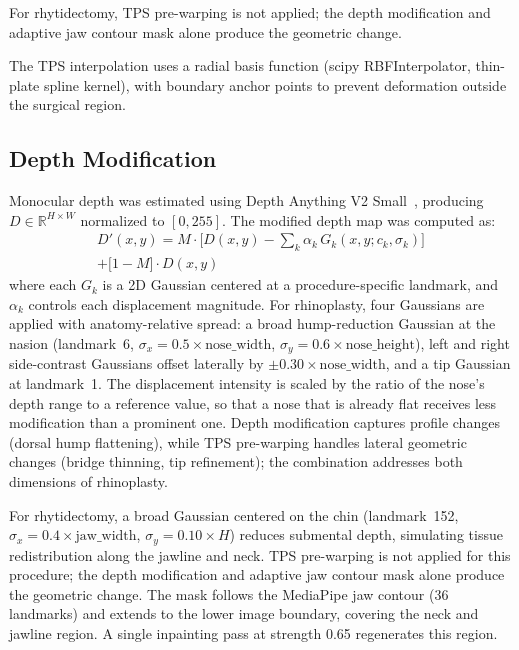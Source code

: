 \documentclass[twocolumn]{article}
\begin{document}
For rhytidectomy, TPS pre-warping is not applied; the depth
modification and adaptive jaw contour mask alone produce the
geometric change.

The TPS interpolation uses a radial basis function
(scipy RBFInterpolator, thin-plate spline kernel),
with boundary anchor points to prevent deformation outside the
surgical region.

\subsection{Depth Modification}

Monocular depth was estimated using Depth Anything V2
Small~\cite{yang2024depth}, producing $D \in \mathbb{R}^{H \times W}$
normalized to $[0, 255]$. The modified depth map was computed as:
\begin{multline}
D'(x,y) = M \!\cdot\! \bigl[D(x,y) - \textstyle\sum_k \alpha_k \,
G_k(x,y; c_k, \sigma_k)\bigr] \\
+ \bigl[1 - M\bigr] \cdot D(x,y)
\label{eq:depth_mod}
\end{multline}
where each $G_k$ is a 2D Gaussian centered at a procedure-specific
landmark, and $\alpha_k$ controls each displacement magnitude.
For rhinoplasty, four Gaussians are applied with anatomy-relative
spread: a broad hump-reduction Gaussian at the nasion (landmark~6,
$\sigma_x = 0.5 \times \text{nose\_width}$,
$\sigma_y = 0.6 \times \text{nose\_height}$), left and right
side-contrast Gaussians offset laterally by
$\pm 0.30 \times \text{nose\_width}$, and a tip Gaussian at
landmark~1. The displacement intensity is scaled by the ratio of the
nose's depth range to a reference value, so that a nose that is
already flat receives less modification than a prominent one. Depth modification captures profile changes (dorsal
hump flattening), while TPS pre-warping handles lateral geometric
changes (bridge thinning, tip refinement); the combination addresses
both dimensions of rhinoplasty.

For rhytidectomy, a broad Gaussian centered on the chin
(landmark~152, $\sigma_x = 0.4 \times \text{jaw\_width}$,
$\sigma_y = 0.10 \times H$) reduces submental depth, simulating
tissue redistribution along the jawline and neck. TPS pre-warping is
not applied for this procedure; the depth modification and adaptive
jaw contour mask alone produce the geometric change. The mask follows
the MediaPipe jaw contour (36 landmarks) and extends to the lower
image boundary, covering the neck and jawline region. A single
inpainting pass at strength 0.65 regenerates this region.
\end{document}
